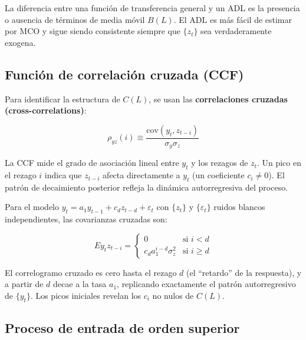 \documentclass[12pt]{article}
\begin{document}
\begin{intuicion}
La diferencia entre una funci\'on de transferencia general y un ADL es la presencia o ausencia de t\'erminos de media m\'ovil $B(L)$. El ADL es m\'as f\'acil de estimar por MCO y sigue siendo consistente siempre que $\{z_t\}$ sea verdaderamente exogena.
\end{intuicion}

\subsection{Funci\'on de correlaci\'on cruzada (CCF)}

Para identificar la estructura de $C(L)$, se usan las \textbf{correlaciones cruzadas (cross-correlations)}:

\begin{equation}
\rho_{yz}(i) \equiv \frac{\text{cov}(y_t, z_{t-i})}{\sigma_y \sigma_z}
\end{equation}

\begin{intuicionmat}
La CCF mide el grado de asociaci\'on lineal entre $y_t$ y los rezagos de $z_t$. Un pico en el rezago $i$ indica que $z_{t-i}$ afecta directamente a $y_t$ (un coeficiente $c_i \neq 0$). El patr\'on de decaimiento posterior refleja la din\'amica autorregresiva del proceso.
\end{intuicionmat}

Para el modelo $y_t = a_1 y_{t-1} + c_d z_{t-d} + \varepsilon_t$ con $\{z_t\}$ y $\{\varepsilon_t\}$ ruidos blancos independientes, las covarianzas cruzadas son:

\begin{equation}
E y_t z_{t-i} = \begin{cases} 0 & \text{si } i < d \\ c_d a_1^{i-d} \sigma_z^2 & \text{si } i \geq d \end{cases}
\end{equation}

\begin{intuicionmat}
El correlogramo cruzado es cero hasta el rezago $d$ (el ``retardo'' de la respuesta), y a partir de $d$ decae a la tasa $a_1$, replicando exactamente el patr\'on autorregresivo de $\{y_t\}$. Los picos iniciales revelan los $c_i$ no nulos de $C(L)$.
\end{intuicionmat}

\subsection{Proceso de entrada de orden superior}
\end{document}
